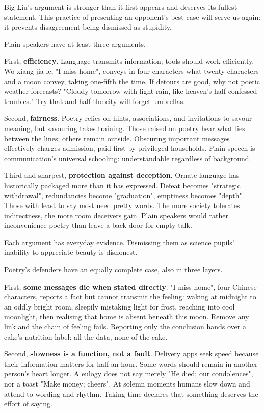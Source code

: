 Big Liu's argument is stronger than it first appears and deserves its fullest statement. This practice of presenting an opponent's best case will serve us again: it prevents disagreement being dismissed as stupidity.

Plain speakers have at least three arguments.

First, \textbf{efficiency}. Language transmits information; tools should work efficiently. Wo xiang jia le, "I miss home", conveys in four characters what twenty characters and a moon convey, taking one-fifth the time. If detours are good, why not poetic weather forecasts? "Cloudy tomorrow with light rain, like heaven's half-confessed troubles." Try that and half the city will forget umbrellas.

Second, \textbf{fairness}. Poetry relies on hints, associations, and invitations to savour meaning, but savouring takes training. Those raised on poetry hear what lies between the lines; others remain outside. Obscuring important messages effectively charges admission, paid first by privileged households. Plain speech is communication's universal schooling: understandable regardless of background.

Third and sharpest, \textbf{protection against deception}. Ornate language has historically packaged more than it has expressed. Defeat becomes "strategic withdrawal", redundancies become "graduation", emptiness becomes "depth". Those with least to say most need pretty words. The more society tolerates indirectness, the more room deceivers gain. Plain speakers would rather inconvenience poetry than leave a back door for empty talk.

Each argument has everyday evidence. Dismissing them as science pupils' inability to appreciate beauty is dishonest.

Poetry's defenders have an equally complete case, also in three layers.

First, \textbf{some messages die when stated directly}. "I miss home", four Chinese characters, reports a fact but cannot transmit the feeling: waking at midnight to an oddly bright room, sleepily mistaking light for frost, reaching into cool moonlight, then realising that home is absent beneath this moon. Remove any link and the chain of feeling fails. Reporting only the conclusion hands over a cake's nutrition label: all the data, none of the cake.

Second, \textbf{slowness is a function, not a fault}. Delivery apps seek speed because their information matters for half an hour. Some words should remain in another person's heart longer. A eulogy does not say merely "He died; our condolences", nor a toast "Make money; cheers". At solemn moments humans slow down and attend to wording and rhythm. Taking time declares that something deserves the effort of saying.

